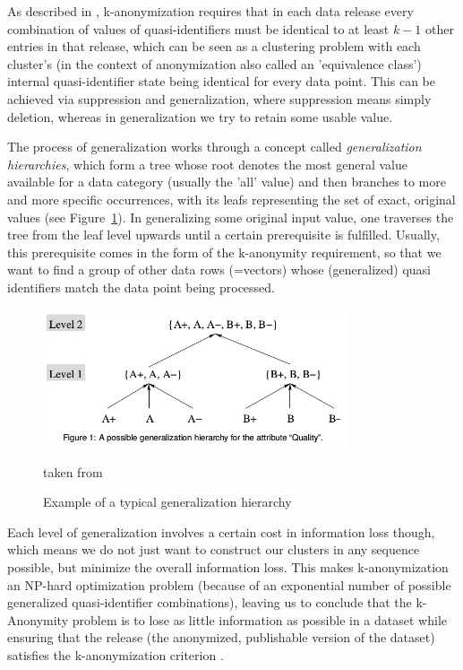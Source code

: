 \documentclass{llncs}
\begin{document}
As described in \cite{ciriani2007kappa}, k-anonymization requires that in each data release every combination of values of quasi-identifiers must be identical to at least $k-1$ other entries in that release, which can be seen as a clustering problem with each cluster's (in the context of anonymization also called an 'equivalence class') internal quasi-identifier state being identical for every data point. This can be achieved via suppression and generalization, where suppression means simply deletion, whereas in generalization we try to retain some usable value.

The process of generalization works through a concept called \textit{generalization hierarchies}, which form a tree whose root denotes the most general value available for a data category (usually the 'all' value) and then branches to more and more specific occurrences, with its leafs representing the set of exact, original values (see Figure~\ref{fig:gen_hierarchy}). In generalizing some original input value, one traverses the tree from the leaf level upwards until a certain prerequisite is fulfilled. Usually, this prerequisite comes in the form of the k-anonymity requirement, so that we want to find a group of other data rows (=vectors) whose (generalized) quasi identifiers match the data point being processed.

\begin{figure}[!t]
	\begin{center}
		\includegraphics[width=0.8\textwidth]{figures/anonym/gen_hierarchy}
		\caption{Example of a typical generalization hierarchy}
		\label{fig:gen_hierarchy}
		\small
		taken from \cite{aggarwal2005approximation}
	\end{center}
\end{figure}


Each level of generalization involves a certain cost in information loss though, which means we do not just want to construct our clusters in any sequence possible, but minimize the overall information loss. This makes k-anonymization an NP-hard optimization problem (because of an exponential number of possible generalized quasi-identifier combinations), leaving us to conclude that the k-Anonymity problem is to lose as little information as possible in a dataset while ensuring that the release (the anonymized, publishable version of the dataset) satisfies the k-anonymization criterion \cite{aggarwal2005approximation}.
\end{document}
